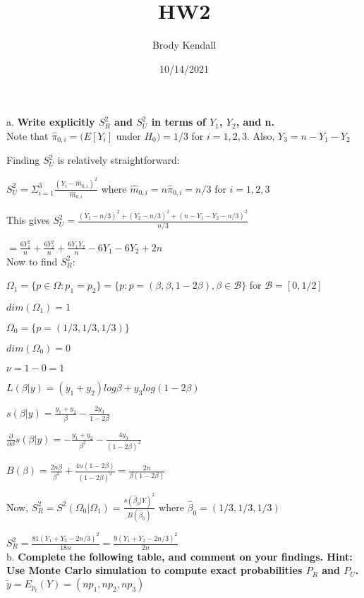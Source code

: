 \documentclass{article}
\title{HW2}
\author{Brody Kendall}
\date{10/14/2021}
\begin{document}
\maketitle

a. \textbf{Write explicitly $S^2_R$ and $S^2_U$ in terms of $Y_1$, $Y_2$, and n.}\\

Note that $\hat\pi_{0,i} = (E[Y_i]$ under $H_0) = 1/3$ for $i=1,2,3$. Also, $Y_3 = n - Y_1 - Y_2$

Finding $S^2_U$ is relatively straightforward:

$S^2_U = \Sigma_{i=1}^3 \frac{(Y_i-\hat{m}_{0,i})^2}{\hat{m}_{0,i}}$ where $\hat{m}_{0,i} = n\hat\pi_{0,i} = n/3$ for $i=1,2,3$

This gives $S^2_U = \frac{(Y_1 - n/3)^2 + (Y_2 - n/3)^2 + (n-Y_1-Y_2-n/3)^2}{n/3}$

$ = \frac{6Y_1^2}{n} + \frac{6Y_2^2}{n} + \frac{6Y_1Y_2}{n} - 6Y_1 - 6Y_2 + 2n$
\\

Now to find $S^2_R$:

$\Omega_1 = \{p \in \Omega : p_1 = p_2\} = \{p:p=(\beta, \beta, 1-2\beta), \beta \in \mathcal{B}\}$ for $\mathcal{B} = [0,1/2]$

$dim(\Omega_1) = 1$

$\Omega_0 = \{p = (1/3, 1/3, 1/3)\}$

$dim(\Omega_0) = 0$

$\nu = 1-0=1$

$L(\beta | y) = (y_1 + y_2)log\beta + y_3log(1-2\beta)$

$s(\beta | y) = \frac{y_1 + y_2}{\beta} - \frac{2y_3}{1-2\beta}$

$\frac{\partial}{\partial\beta}s(\beta|y) = -\frac{y_1+y_2}{\beta^2} - \frac{4y_3}{(1-2\beta)^2}$

$B(\beta) = \frac{2n\beta}{\beta^2} + \frac{4n(1-2\beta)}{(1-2\beta)^2} = \frac{2n}{\beta(1-2\beta)}$

Now, $S^2_R = S^2(\Omega_0 | \Omega_1) = \frac{s(\hat\beta_0 | Y)^2}{B(\hat\beta_0)}$ where $\hat\beta_0 = (1/3, 1/3, 1/3)$

$S^2_R = \frac{81(Y_1 + Y_2 - 2n/3)^2}{18n} = \frac{9(Y_1 + Y_2 - 2n/3)^2}{2n}$
\\

b. \textbf{Complete the following table, and comment on your findings. Hint: Use Monte Carlo simulation to compute exact probabilities $P_R$ and $P_U$.}\\

$\tilde{y} = E_{p_t}(Y) = (np_1, np_2, np_3)$
\end{document}
